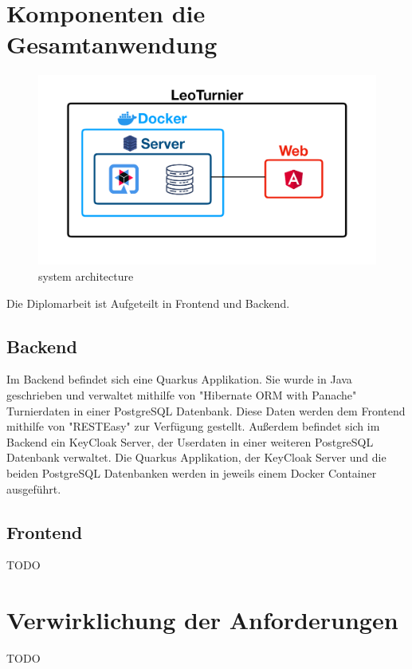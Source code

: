 \section{Komponenten die Gesamtanwendung}

\begin{figure}[H]
    \includegraphics[scale=0.30]{pics/system_architecture.png}
    \caption{system architecture}
\end{figure}

Die Diplomarbeit ist Aufgeteilt in Frontend und Backend. 

\subsection{Backend}

Im Backend befindet sich eine Quarkus Applikation. Sie wurde in Java geschrieben und verwaltet mithilfe von "Hibernate ORM with Panache" Turnierdaten in einer PostgreSQL Datenbank.
Diese Daten werden dem Frontend mithilfe von "RESTEasy" zur Verfügung gestellt. Außerdem befindet sich im Backend ein KeyCloak Server, der Userdaten in einer weiteren PostgreSQL Datenbank 
verwaltet. Die Quarkus Applikation, der KeyCloak Server und die beiden PostgreSQL Datenbanken werden in jeweils einem Docker Container ausgeführt.

\subsection{Frontend}

TODO

\section{Verwirklichung der Anforderungen}

TODO